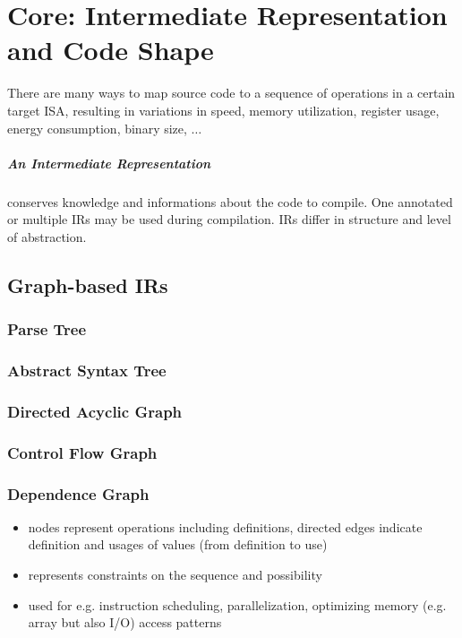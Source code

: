 \chapter{Core: Intermediate Representation and Code Shape}
There are many ways to map source code to a sequence of operations in a certain target ISA, resulting in variations in speed, memory utilization, register usage, energy consumption, binary size, $\dots$

\paragraph{An Intermediate Representation} conserves knowledge and informations about the code to compile. One annotated or multiple IRs may be used during compilation. IRs differ in structure and level of abstraction.
\section{Graph-based IRs}
\subsection{Parse Tree}

\subsection{Abstract Syntax Tree}

\subsection{Directed Acyclic Graph}

\subsection{Control Flow Graph}

\subsection{Dependence Graph}
\begin{itemize}
    \item nodes represent operations including definitions, directed edges indicate definition and usages of values (from definition to use)
    \item represents constraints on the sequence and possibility 
    \item used for e.g. instruction scheduling, parallelization, optimizing memory (e.g. array but also I/O) access patterns
\end{itemize}

